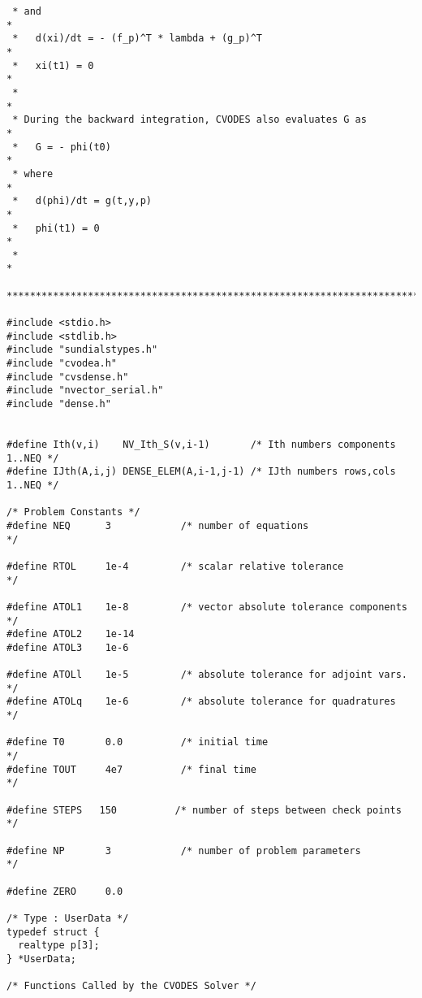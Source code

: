\begin{verbatim}
 * and                                                                  *
 *   d(xi)/dt = - (f_p)^T * lambda + (g_p)^T                            *
 *   xi(t1) = 0                                                         *
 *                                                                      *
 * During the backward integration, CVODES also evaluates G as          *
 *   G = - phi(t0)                                                      *
 * where                                                                *
 *   d(phi)/dt = g(t,y,p)                                               *
 *   phi(t1) = 0                                                        *
 *                                                                      *
 ************************************************************************/

#include <stdio.h>
#include <stdlib.h>
#include "sundialstypes.h"
#include "cvodea.h"
#include "cvsdense.h"
#include "nvector_serial.h"
#include "dense.h"


#define Ith(v,i)    NV_Ith_S(v,i-1)       /* Ith numbers components 1..NEQ */
#define IJth(A,i,j) DENSE_ELEM(A,i-1,j-1) /* IJth numbers rows,cols 1..NEQ */

/* Problem Constants */
#define NEQ      3            /* number of equations                  */

#define RTOL     1e-4         /* scalar relative tolerance            */

#define ATOL1    1e-8         /* vector absolute tolerance components */
#define ATOL2    1e-14
#define ATOL3    1e-6

#define ATOLl    1e-5         /* absolute tolerance for adjoint vars. */
#define ATOLq    1e-6         /* absolute tolerance for quadratures   */

#define T0       0.0          /* initial time                         */
#define TOUT     4e7          /* final time                           */

#define STEPS   150          /* number of steps between check points */

#define NP       3            /* number of problem parameters         */

#define ZERO     0.0

/* Type : UserData */
typedef struct {
  realtype p[3];
} *UserData;

/* Functions Called by the CVODES Solver */


\end{verbatim}
